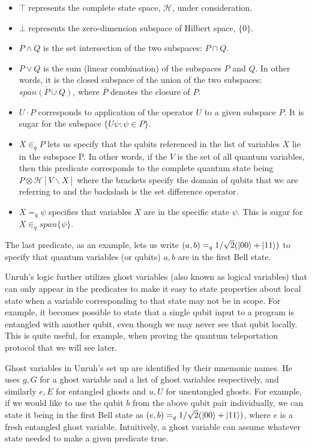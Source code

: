 \documentclass[adraft,creativecommons]{eptcs}
\theoremstyle{definition}
\theoremstyle{remark}
\begin{document}
\begin{itemize}
	\item $\top$ represents the complete state space, $\mathcal{H}$, under consideration.
	\item $\bot$ represents the zero-dimension subspace of Hilbert space, $\{0\}$.
	\item $P \wedge Q$ is the set intersection of the two subspaces: $P \cap Q$.
	\item $P \vee Q$ is the sum (linear combination) of the subspaces $P$ and $Q$. In other words, it is the closed subspace of the union of the two subspaces: $\overline{\mathit{span}(P \cup Q)}$, where $\overline{P}$ denotes the closure of $P$.
	\item $U \cdot P$ corresponds to application of the operator $U$ to a given subspace $P$. It is sugar for the subspace $\{U \psi: \psi \in P\}$.
	\item $X \in_q P$ lets us specify that the qubits referenced in the list of variables $X$ lie in the subspace P. In other words, if the $V$ is the set of all quantum variables, then this predicate corresponds to the complete quantum state being $P \otimes \mathcal{H}[V \backslash X]$ where the brackets specify the domain of qubits that we are referring to and the backslash is the set difference operator.
	\item $X =_q \psi$ specifies that variables $X$ are in the specific state $\psi$. This is sugar for $X \in_q \mathit{span}\{\psi\}$.
\end{itemize}

The last predicate, as an example, lets us write $(a, b) =_q 1/\sqrt{2}(\ket{00}+\ket{11})$ to specify that quantum variables (or qubits) $a, b$ are in the first Bell state.

Unruh's logic further utilizes ghost variables (also known as logical variables) that can only appear in the predicates to make it easy to state properties about local state when a variable corresponding to that state may not be in scope. For example, it becomes possible to state that a single qubit input to a program is entangled with another qubit, even though we may never see that qubit locally. This is quite useful, for example, when proving the quantum teleportation protocol that we will see later.

Ghost variables in Unruh's set up are identified by their mnemonic names. He uses $g, G$ for a ghost variable and a list of ghost variables respectively, and similarly $e, E$ for entangled ghosts and $u, U$ for unentangled ghosts. For example, if we would like to use the qubit $b$ from the above qubit pair individually, we can state it being in the first Bell state as $(e, b) =_q 1/\sqrt{2}(\ket{00}+\ket{11})$, where $e$ is a fresh entangled ghost variable. Intuitively, a ghost variable can assume whatever state needed to make a given predicate true.
\end{document}
